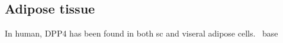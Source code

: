 \subsection{Adipose tissue}
In human, DPP4 has been found in both sc and viseral adipose cells.~\cite{Lamers2011} base 